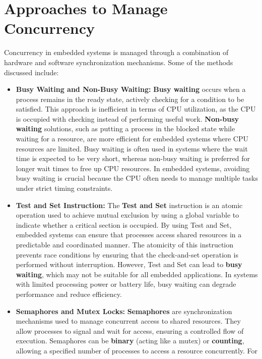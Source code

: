 \documentclass[
  14pt,
  a4paper,
  DIV=11,
  numbers=noendperiod,
  headinclude=true,
  footinclude=true]{scrreprt}
\begin{document}
\section{Approaches to Manage
Concurrency}\label{approaches-to-manage-concurrency}

Concurrency in embedded systems is managed through a combination of
hardware and software synchronization mechanisms. Some of the methods
discussed include:

\begin{itemize}
\item
  \textbf{Busy Waiting and Non-Busy Waiting:} \textbf{Busy waiting}
  occurs when a process remains in the ready state, actively checking
  for a condition to be satisfied. This approach is inefficient in terms
  of CPU utilization, as the CPU is occupied with checking instead of
  performing useful work. \textbf{Non-busy waiting} solutions, such as
  putting a process in the blocked state while waiting for a resource,
  are more efficient for embedded systems where CPU resources are
  limited. Busy waiting is often used in systems where the wait time is
  expected to be very short, whereas non-busy waiting is preferred for
  longer wait times to free up CPU resources. In embedded systems,
  avoiding busy waiting is crucial because the CPU often needs to manage
  multiple tasks under strict timing constraints.
\item
  \textbf{Test and Set Instruction:} The \textbf{Test and Set}
  instruction is an atomic operation used to achieve mutual exclusion by
  using a global variable to indicate whether a critical section is
  occupied. By using Test and Set, embedded systems can ensure that
  processes access shared resources in a predictable and coordinated
  manner. The atomicity of this instruction prevents race conditions by
  ensuring that the check-and-set operation is performed without
  interruption. However, Test and Set can lead to \textbf{busy waiting},
  which may not be suitable for all embedded applications. In systems
  with limited processing power or battery life, busy waiting can
  degrade performance and reduce efficiency.
\item
  \textbf{Semaphores and Mutex Locks:} \textbf{Semaphores} are
  synchronization mechanisms used to manage concurrent access to shared
  resources. They allow processes to signal and wait for access,
  ensuring a controlled flow of execution. Semaphores can be
  \textbf{binary} (acting like a mutex) or \textbf{counting}, allowing a
  specified number of processes to access a resource concurrently. For

\end{itemize}
\end{document}

